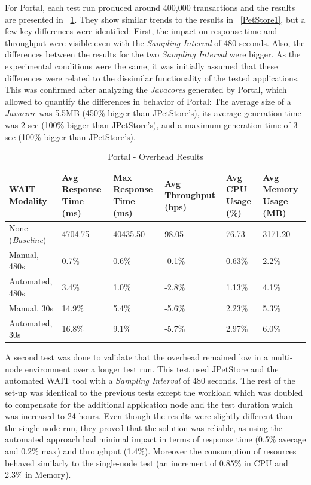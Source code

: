 \documentclass[runningheads,a4paper]{llncs}
\begin{document}
For Portal, each test run produced around 400,000 transactions and the
results are presented in \tablename ~\ref{Portal1}. They show similar trends
to the results in \tablename ~\ref{PetStore1}, but a few
key differences were identified: First, the impact on response time and
throughput were visible even with the \emph{Sampling Interval} of 480 seconds.
Also, the differences between the results for the two \emph{Sampling Interval}
were bigger. As the experimental conditions were the same, it was initially
assumed that these differences were related to the dissimilar functionality of the 
tested applications. This was confirmed after analyzing the \emph{Javacores} generated 
by Portal, which allowed to quantify the differences in behavior of Portal: The
average size of a \emph{Javacore} was 5.5MB (450\% bigger than JPetStore's), its
average generation time was 2 sec (100\% bigger than JPetStore's), and a
maximum generation time of 3 sec (100\% bigger than JPetStore's).

\begin{table}[!h]
\caption{Portal - Overhead Results}
\label{Portal1}
\centering
\begin{tabular}{p{}|p{}|p{}|p{}|p{}|p{}}
\hline
\bfseries WAIT Modality & \bfseries Avg Response Time (ms)& \bfseries Max
Response Time (ms)& \bfseries Avg Throughput (hps)& \bfseries Avg CPU Usage
(\%) & \bfseries Avg Memory Usage (MB)\\
\hline
None (\emph{Baseline}) 	& 4704.75	& 40435.50	& 98.05 	& 76.73 	& 3171.20\\
Manual, 480s 			& 0.7\% 	& 0.6\%		& -0.1\%	& 0.63\% 	& 2.2\%\\
Automated, 480s 		& 3.4\%		& 1.0\%		& -2.8\% 	& 1.13\% 	& 4.1\%\\
Manual, 30s 			& 14.9\%	& 5.4\%		& -5.6\% 	& 2.23\% 	& 5.3\%\\
Automated, 30s 			& 16.8\%	& 9.1\%		& -5.7\% 	& 2.97\% 	& 6.0\%\\
\hline
\end{tabular}
\end{table}

A second test was done to validate that the overhead remained low in a
multi-node environment over a longer test run. This test used JPetStore and the
automated WAIT tool with a \emph{Sampling Interval} of 480 seconds. The rest of
the set-up was identical to the previous tests except the workload which was doubled
to compensate for the additional application node and the test duration which
was increased to 24 hours. Even though the results were slightly different than the
single-node run, they proved that the solution was reliable, as using the
automated approach had minimal impact in terms of response time (0.5\% 
average and 0.2\% max) and throughput (1.4\%). Moreover the consumption
of resources behaved similarly to the single-node test (an increment of 0.85\%
in CPU and 2.3\% in Memory). 
\end{document}
